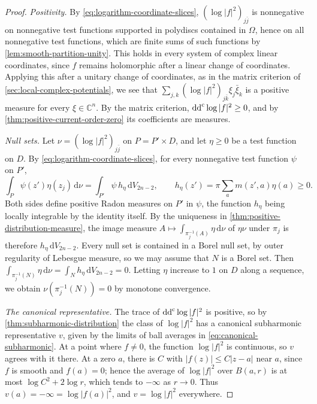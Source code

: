 \begin{proof}
\emph{Positivity.} By \eqref{eq:logarithm-coordinate-slices}, $(\log|f|^2)_{j\bar j}$ is nonnegative on nonnegative test functions supported in polydiscs contained in $\Omega$, hence on all nonnegative test functions, which are finite sums of such functions by \cref{lem:smooth-partition-unity}. This holds in every system of complex linear coordinates, since $f$ remains holomorphic after a linear change of coordinates. Applying this after a unitary change of coordinates, as in the matrix criterion of \cref{sec:local-complex-potentials}, we see that $\sum_{j,k}(\log|f|^2)_{j\bar k}\xi_j\bar\xi_k$ is a positive measure for every $\xi\in\mathbb C^n$. By the matrix criterion, $\mathrm{dd}^{\mathrm{c}}\log|f|^2\geq0$, and by \cref{thm:positive-current-order-zero} its coefficients are measures.

\emph{Null sets.} Let $\nu=(\log|f|^2)_{j\bar j}$ on $P=P'\times D$, and let $\eta\geq0$ be a test function on $D$. By \eqref{eq:logarithm-coordinate-slices}, for every nonnegative test function $\psi$ on $P'$,
\[
 \int_P\psi(z')\eta(z_j)\,\mathrm d\nu=\int_{P'}\psi\,h_\eta\,\mathrm dV_{2n-2},\qquad h_\eta(z')=\pi\sum_am(z',a)\eta(a)\geq0.
\]
Both sides define positive Radon measures on $P'$ in $\psi$, the function $h_\eta$ being locally integrable by the identity itself. By the uniqueness in \cref{thm:positive-distribution-measure}, the image measure $A\mapsto\int_{\pi_j^{-1}(A)}\eta\,\mathrm d\nu$ of $\eta\nu$ under $\pi_j$ is therefore $h_\eta\,\mathrm dV_{2n-2}$. Every null set is contained in a Borel null set, by outer regularity of Lebesgue measure, so we may assume that $N$ is a Borel set. Then $\int_{\pi_j^{-1}(N)}\eta\,\mathrm d\nu=\int_Nh_\eta\,\mathrm dV_{2n-2}=0$. Letting $\eta$ increase to $1$ on $D$ along a sequence, we obtain $\nu(\pi_j^{-1}(N))=0$ by monotone convergence.

\emph{The canonical representative.} The trace of $\mathrm{dd}^{\mathrm{c}}\log|f|^2$ is positive, so by \cref{thm:subharmonic-distribution} the class of $\log|f|^2$ has a canonical subharmonic representative $v$, given by the limits of ball averages in \eqref{eq:canonical-subharmonic}. At a point where $f\neq0$, the function $\log|f|^2$ is continuous, so $v$ agrees with it there. At a zero $a$, there is $C$ with $|f(z)|\leq C|z-a|$ near $a$, since $f$ is smooth and $f(a)=0$; hence the average of $\log|f|^2$ over $B(a,r)$ is at most $\log C^2+2\log r$, which tends to $-\infty$ as $r\to0$. Thus $v(a)=-\infty=\log|f(a)|^2$, and $v=\log|f|^2$ everywhere.
\end{proof}

